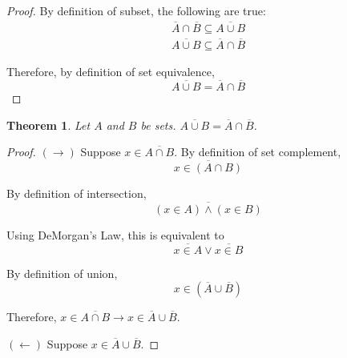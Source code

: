 \documentclass{article}
\newtheorem{theorem}{Theorem}
\numberwithin{subcase}{case}
\begin{document}
\begin{outline}[enumerate]
\begin{proof}
            By definition of subset, the following are true:
            \begin{equation}
                \begin{aligned}
                    \overline{A} \cap \overline{B} \subseteq \overline{A \cup B}   \\
                    \overline{A \cup B} \subseteq \overline{A} \cap \overline{B}  
                \end{aligned}
            \end{equation}

            Therefore, by definition of set equivalence,
            \begin{equation}
                \overline{A \cup B} = \overline{A} \cap \overline{B}
            \end{equation}
        \end{proof}
    
    \1 \begin{theorem}
        Let $A$ and $B$ be sets. $\overline{A \cup B} = \overline{A} \cap \overline{B}$.
        \end{theorem}
        \begin{proof}
            $(\rightarrow)$ Suppose $x \in \overline{A \cap B}$. By 
            definition of set complement, 
            \begin{equation}
                \overline{x \in (A \cap B)}
            \end{equation} 

            By definition of intersection, 
            \begin{equation}
                \overline{(x \in A) \wedge (x \in B)}
            \end{equation}

            Using DeMorgan's Law, this is equivalent to 
            \begin{equation}
                \overline{x \in A} \vee \overline{x \in B}
            \end{equation}

            By definition of union,
            \begin{equation}
                x \in (\overline{A} \cup \overline{B})
            \end{equation}
            
            Therefore, $x \in \overline{A \cap B} \rightarrow x \in \overline{A} \cup \overline{B}$.

            $(\leftarrow)$ Suppose $x \in \overline{A} \cup \overline{B}$. 
            

\end{proof}
\end{outline}
\end{document}
